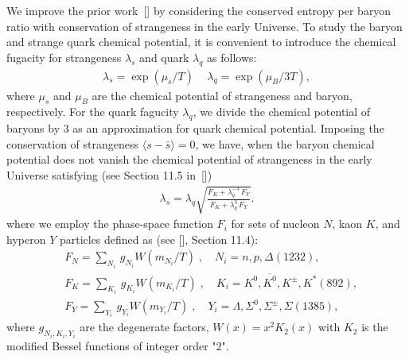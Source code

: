 We improve the prior work~[\cite{Fromerth:2012fe}] by considering the conserved entropy per baryon ratio with conservation of strangeness in the early Universe. To study the baryon and strange quark chemical potential, it is convenient to introduce the chemical fugacity for strangeness $\lambda_s$ and quark $\lambda_q$ as follows:
\begin{align}
\lambda_s=\exp(\mu_s/T)\,\quad \lambda_q=\exp(\mu_B/3T),
\end{align}
where $\mu_s$ and $\mu_B$ are the chemical potential of strangeness and baryon, respectively. For the quark fagucity $\lambda_q$, we divide the chemical potential of baryons by 3 as an approximation for quark chemical potential. Imposing the conservation of strangeness  
$\langle s-\bar s \rangle=0$, we have, when the baryon chemical potential does not vanish the chemical potential of strangeness in the early Universe satisfying (see Section 11.5 in \,[\cite{Letessier:2002ony}])
\begin{align}\label{museq}
\lambda_s=\lambda_q\sqrt{\frac{F_K+\lambda^{-3}_q\,F_Y}{F_K+\lambda^3_q\,F_Y}}.
\end{align}
where we employ the phase-space function $F_i$ for sets of nucleon $N$, kaon $K$, and hyperon $Y$ particles defined as (see [\cite{Letessier:2002ony}], Section 11.4):
\begin{align}
&F_N=\sum_{N_i}\,g_{N_i}W(m_{N_i}/T)\;, \quad N_i=n, p, \Delta(1232),\\
&F_K=\sum_{K_i}\,g_{K_i}W(m_{K_i}/T)\;, \quad K_i=K^0, \overline{K^0}, K^\pm, K^\ast(892),\\
&F_Y=\sum_{Y_i}\,g_{Y_i}W(m_{Y_i}/T)\;, \quad Y_i=\Lambda, \Sigma^0,\Sigma^\pm, \Sigma(1385),
\end{align}
where $g_{N_i,K_i,Y_i}$ are the degenerate factors, $W(x)=x^2K_2(x)$ with $K_2$ is the modified Bessel functions of integer order "$2$".  


